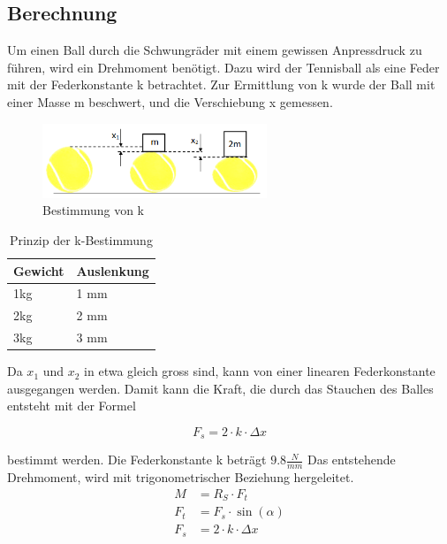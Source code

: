 \subsection{Berechnung}
Um einen Ball durch die Schwungräder mit einem gewissen Anpressdruck zu führen, wird ein
Drehmoment benötigt. Dazu wird der Tennisball als eine Feder mit der Federkonstante k betrachtet. Zur Ermittlung von k wurde der Ball mit einer Masse m
beschwert, und die Verschiebung x gemessen.

\begin{figure}[h!]
	\centering
	\includegraphics[width=0.6\textwidth]{Enddokumentation/Anhang/Bilder/KompressionBaelle.png}
	\caption{Bestimmung von k}
	\label{fig:BallKomp}
\end{figure}

\begin{table}[h!]
	\begin{tabular}{p{1.5cm}p{1.7cm}}
		Gewicht & Auslenkung\\
		\hline
		1kg & 1 mm\\
		2kg & 2 mm\\
		3kg & 3 mm\\
	\end{tabular}
	\centering
	\caption{Prinzip der k-Bestimmung}
	\label{tab:BallKompErgebnis}
\end{table}

Da $x_1$ und $x_2$ in etwa gleich gross sind, kann von einer linearen Federkonstante
ausgegangen werden. Damit kann die Kraft, die durch das Stauchen des Balles entsteht mit der
Formel

\begin{equation}  
    F_s=2\cdot k \cdot \Delta x 
\end{equation}

bestimmt werden. Die Federkonstante k beträgt $9.8\frac{N}{mm}$ Das entstehende Drehmoment,
wird mit trigonometrischer Beziehung hergeleitet.
\begin{align}  
    \label{equ:Formel_M} %
    M &= R_S \cdot F_t\\
    F_t &= F_s \cdot \sin(\alpha)\\ 
    F_s &= 2\cdot k \cdot \Delta x 
\end{align}


